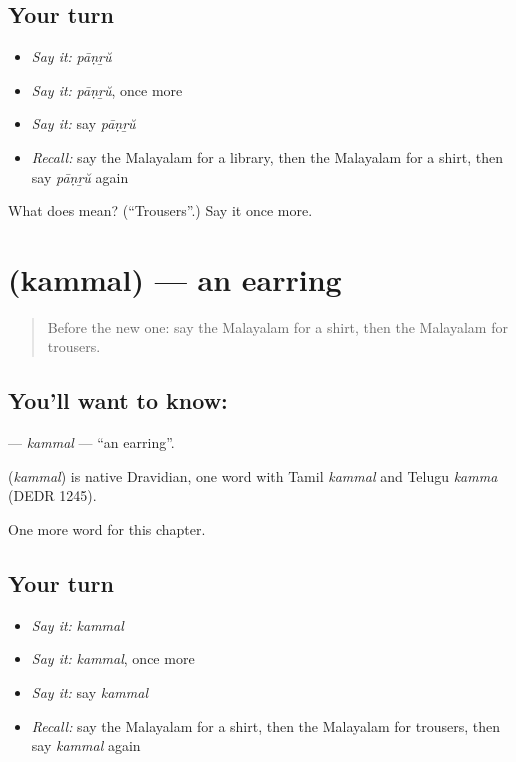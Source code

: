 \subsection*{Your turn}
\begin{itemize}
\raggedright
  \item \emph{Say it:} \emph{pāṇṟŭ}
  \item \emph{Say it:} \emph{pāṇṟŭ}, once more
  \item \emph{Say it:} say \emph{pāṇṟŭ}
  \item \emph{Recall:} say the Malayalam for a library, then the Malayalam for a shirt, then say \emph{pāṇṟŭ} again
\end{itemize}

\begin{tcolorbox}[breakable,colback=teal!4,colframe=teal!35!black,title={Before you move on}]
What does  mean? (\textquotedblleft{}Trousers\textquotedblright{}.) Say it once more.
\end{tcolorbox}
\section[\texorpdfstring{\ml{കമ്മൽ} (kammal)}{കമ്മൽ (kammal)}]{ (kammal) — an earring}

\label{lesson:ML-C156-kammal}



\begin{quote}
Before the new one: say the Malayalam for a shirt, then the Malayalam for trousers.
\end{quote}

\subsection*{You'll want to know: }
\textbf{} — \emph{kammal} — \textquotedblleft{}an earring\textquotedblright{}.

\begin{cousinweb}
\textbf{} (\emph{kammal}) is native Dravidian, one word with Tamil \emph{kammal} and Telugu \emph{kamma} (DEDR 1245).
\end{cousinweb}

\begin{grammarlens}[title={What you've built}]
One more word for this chapter.
\end{grammarlens}

\subsection*{Your turn}
\begin{itemize}
\raggedright
  \item \emph{Say it:} \emph{kammal}
  \item \emph{Say it:} \emph{kammal}, once more
  \item \emph{Say it:} say \emph{kammal}
  \item \emph{Recall:} say the Malayalam for a shirt, then the Malayalam for trousers, then say \emph{kammal} again
\end{itemize}

